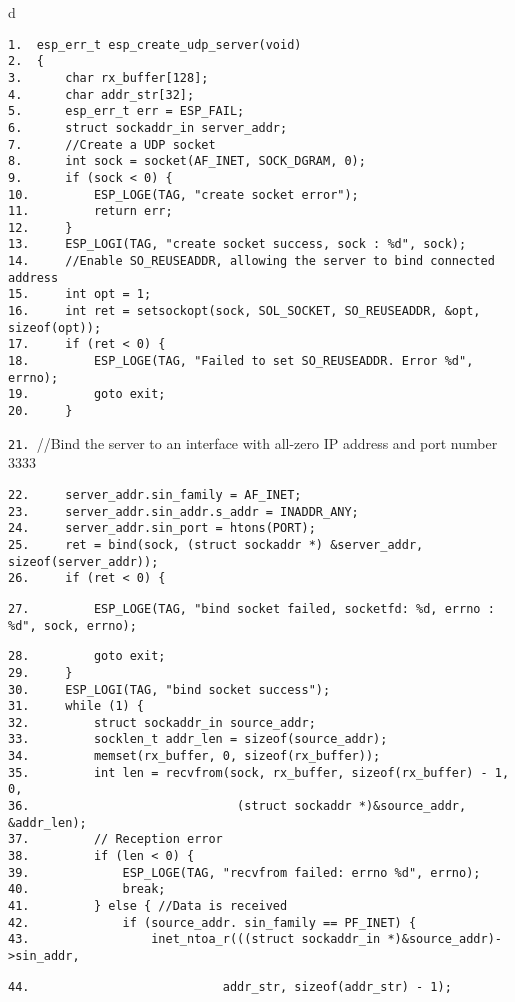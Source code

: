 \documentclass[a4paper,12pt]{book}
\begin{document}
\begin{codebloc}
\begin{tabular}{d}
\vspace{2pt}
\begin{verbatim}
1.  esp_err_t esp_create_udp_server(void)
2.  {
3.      char rx_buffer[128];
4.      char addr_str[32];
5.      esp_err_t err = ESP_FAIL;
6.      struct sockaddr_in server_addr;
7.      //Create a UDP socket
8.      int sock = socket(AF_INET, SOCK_DGRAM, 0);
9.      if (sock < 0) {
10.         ESP_LOGE(TAG, "create socket error");
11.         return err;
12.     }
13.     ESP_LOGI(TAG, "create socket success, sock : %d", sock);
14.     //Enable SO_REUSEADDR, allowing the server to bind connected address
15.     int opt = 1;
16.     int ret = setsockopt(sock, SOL_SOCKET, SO_REUSEADDR, &opt, sizeof(opt));
17.     if (ret < 0) {
18.         ESP_LOGE(TAG, "Failed to set SO_REUSEADDR. Error %d", errno);
19.         goto exit;
20.     }
\end{verbatim}
\verb|21. |\fontsize{9.5pt}{10pt}\selectfont//Bind the server to an interface with all-zero IP address and port number 3333
\footnotesize
\begin{verbatim}
22.     server_addr.sin_family = AF_INET;
23.     server_addr.sin_addr.s_addr = INADDR_ANY;
24.     server_addr.sin_port = htons(PORT);
25.     ret = bind(sock, (struct sockaddr *) &server_addr, sizeof(server_addr));
26.     if (ret < 0) {
\end{verbatim}
\verb|27.         |\fontsize{9pt}{10pt}\selectfont\verb|ESP_LOGE(TAG, "bind socket failed, socketfd: %d, errno : %d", sock, errno);|
\footnotesize
\begin{verbatim}
28.         goto exit;
29.     }
30.     ESP_LOGI(TAG, "bind socket success");
31.     while (1) {
32.         struct sockaddr_in source_addr;
33.         socklen_t addr_len = sizeof(source_addr);
34.         memset(rx_buffer, 0, sizeof(rx_buffer));
35.         int len = recvfrom(sock, rx_buffer, sizeof(rx_buffer) - 1, 0,
36.                             (struct sockaddr *)&source_addr, &addr_len);
37.         // Reception error
38.         if (len < 0) {
39.             ESP_LOGE(TAG, "recvfrom failed: errno %d", errno);
40.             break;
41.         } else { //Data is received
42.             if (source_addr. sin_family == PF_INET) {
43.                 inet_ntoa_r(((struct sockaddr_in *)&source_addr)->sin_addr,
\end{verbatim}
\verb|44.                           addr_str, sizeof(addr_str) - 1);|
\end{tabular}
\end{codebloc}
\end{document}
